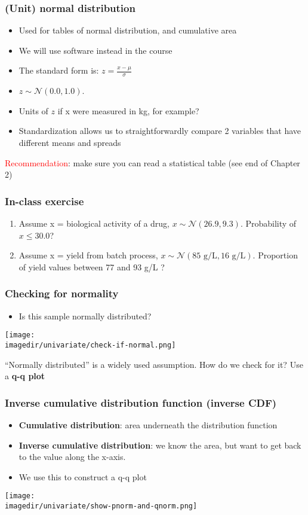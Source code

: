 \begin{frame}\frametitle{(Unit) normal distribution}
	\begin{itemize}
		\item Used for tables of normal distribution, and cumulative area
		\item We will use software instead in the course \pause
		\item The standard form is: $ z = \displaystyle \frac{x - \mu}{\sigma} $
		\item $z \sim \mathcal{N}(0.0, 1.0)$.
		\item Units of $z$ if x were measured in kg, for example? \pause
		\item Standardization allows us to straightforwardly compare 2 variables that have different means and spreads
	\end{itemize}

	\textcolor{red}{Recommendation}: make sure you can read a statistical table (see end of Chapter 2)
\end{frame}

\begin{frame}\frametitle{In-class exercise}
	\begin{enumerate}
		\item Assume x = biological activity of a drug, $x \sim \mathcal{N}(26.9, 9.3)$. Probability of $x \leq 30.0$?
		\item Assume x = yield from batch process, $x \sim \mathcal{N}(85 \text{~g/L}, 16 \text{~g/L})$. Proportion of yield values between 77 and 93 g/L ?
	\end{enumerate}
\end{frame}

\begin{frame}\frametitle{Checking for normality}
	\begin{itemize}
		\item Is this sample normally distributed?
	\end{itemize}

	\texttt{[image: \\imagedir/univariate/check-if-normal.png]}

	``Normally distributed'' is a widely used assumption. How do we check for it? Use a \textbf{q-q plot}
\end{frame}

\begin{frame}\frametitle{Inverse cumulative distribution function (inverse CDF)}
	\begin{itemize}
		\item \textbf{Cumulative distribution}: area underneath the distribution function
		\item \textbf{Inverse cumulative distribution}: we know the area, but want to get back to the value along the x-axis.
		\item We use this to construct a q-q plot
	\end{itemize}

	\texttt{[image: \\imagedir/univariate/show-pnorm-and-qnorm.png]}
\end{frame}

